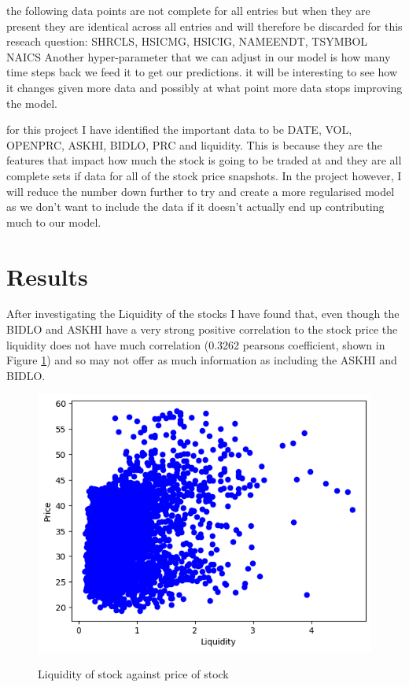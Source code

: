 \documentclass{report}
\begin{document}
the following data points are not complete for all entries but when they are present they are identical across all entries and will therefore be discarded for this reseach question: SHRCLS, HSICMG, HSICIG, NAMEENDT, TSYMBOL NAICS
Another hyper-parameter that we can adjust in our model is how many time steps back we feed it to get our predictions. it will be interesting to see how it changes given more data and possibly at what point more data stops improving the model.


for this project I have identified the important data to be DATE, VOL, OPENPRC, ASKHI, BIDLO, PRC and liquidity. This is because they are the features that impact how much the stock is going to be traded at and they are all complete sets if data for all of the stock price snapshots. In the project however, I will reduce the number down further to try and create a more regularised model as we don't want to include the data if it doesn't actually end up contributing much to our model.

\section{Results}

After investigating the Liquidity of the stocks I have found that, even though the BIDLO and ASKHI have a very strong positive correlation to the stock price the liquidity does not have much correlation (0.3262 pearsons coefficient, shown in Figure \ref{fig:LIQ}) and so may not offer as much information as including the ASKHI and BIDLO.

\begin{figure}
    \caption{Liquidity of stock against price of stock}
    \centering
    \includegraphics[scale=0.5]{LIQ.png}
    \label{fig:LIQ}
\end{figure}
\end{document}
